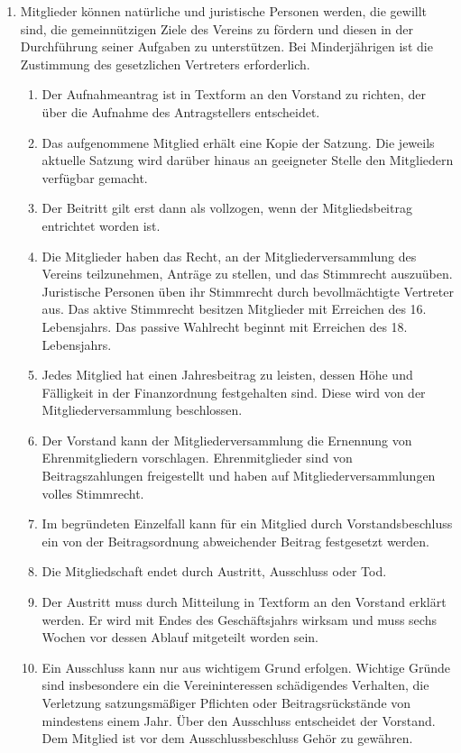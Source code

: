\documentclass[12pt,a4paper]{article}
\begin{document}
\begin{enumerate}
\item Mitglieder können natürliche und juristische Personen werden, die gewillt sind, die gemeinnützigen Ziele des Vereins zu fördern und diesen in der Durchführung seiner Aufgaben zu unterstützen. Bei Minderjährigen ist die Zustimmung des gesetzlichen Vertreters erforderlich.
\begin{enumerate}
\item Der Aufnahmeantrag ist in Textform an den Vorstand zu richten, der über die Aufnahme des Antragstellers entscheidet.
\item Das aufgenommene Mitglied erhält eine Kopie der Satzung. Die jeweils aktuelle Satzung wird darüber hinaus an geeigneter Stelle den Mitgliedern verfügbar gemacht.
\item Der Beitritt gilt erst dann als vollzogen, wenn der Mitgliedsbeitrag entrichtet worden ist.
\item Die Mitglieder haben das Recht, an der Mitgliederversammlung des Vereins teilzunehmen, Anträge zu stellen, und das Stimmrecht auszuüben. Juristische Personen üben ihr Stimmrecht durch bevollmächtigte Vertreter aus. Das aktive Stimmrecht besitzen Mitglieder mit Erreichen des 16. Lebensjahrs. Das passive Wahlrecht beginnt mit Erreichen des 18. Lebensjahrs.
\item Jedes Mitglied hat einen Jahresbeitrag zu leisten, dessen Höhe und Fälligkeit in der Finanzordnung festgehalten sind. Diese wird von der Mitgliederversammlung beschlossen.
\item Der Vorstand kann der Mitgliederversammlung die Ernennung von Ehrenmitgliedern vorschlagen. Ehrenmitglieder sind von Beitragszahlungen freigestellt und haben auf Mitgliederversammlungen volles Stimmrecht.
\item Im begründeten Einzelfall kann für ein Mitglied durch Vorstandsbeschluss ein von der Beitragsordnung abweichender Beitrag festgesetzt werden.
\item Die Mitgliedschaft endet durch Austritt, Ausschluss oder Tod.
\item Der Austritt muss durch Mitteilung in Textform an den Vorstand erklärt werden. Er wird mit Endes des Geschäftsjahrs wirksam und muss sechs Wochen vor dessen Ablauf mitgeteilt worden sein.
\item Ein Ausschluss kann nur aus wichtigem Grund erfolgen.‭ ‬Wichtige Gründe sind insbesondere ein die Vereininteressen schädigendes Verhalten,‭ ‬die Verletzung satzungsmäßiger Pflichten oder Beitragsrückstände von mindestens einem Jahr.‭ ‬Über den Ausschluss entscheidet der Vorstand. ‬Dem Mitglied ist vor dem Ausschlussbeschluss Gehör zu gewähren.

\end{enumerate}
\end{enumerate}
\end{document}
